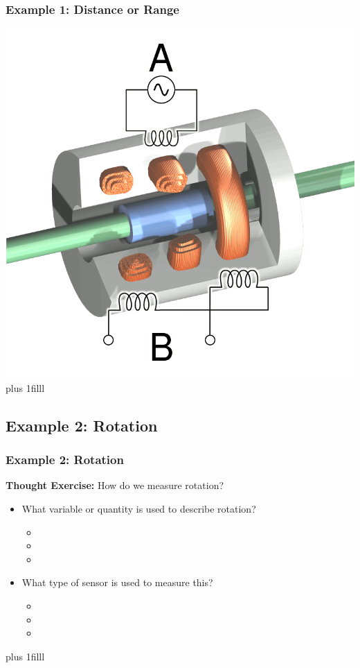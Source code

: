 \documentclass[fleqn]{beamer} %
\newcommand{\sectionIsubsectionIIItitle}{Example 1: Distance or Range}
\newcommand{\sectionIsubsectionIVtitle}{Example 2: Rotation}
\newcommand{\btVFill}{\vskip0pt plus 1filll}
\begin{document}
			\begin{frame}
				\frametitle{\sectionIsubsectionIIItitle}
				\includegraphics[scale=.2]{images/LVDT.png}
				\btVFill

			\end{frame}

		\subsection{\sectionIsubsectionIVtitle}\label{sectionIsubsectionIV}	

			\begin{frame}
				\frametitle{\sectionIsubsectionIVtitle}

					{\bf Thought Exercise:} How do we measure {\BL rotation}?        
	
					\begin{itemize}
					
						\item What variable or quantity is used to describe {\BL rotation}?                         
						\begin{itemize}
							\item
							\item
							\item	
						\end{itemize} \vspace{5mm}
						\item What type of sensor is used to measure this?
						\begin{itemize}
							\item
							\item
							\item	
						\end{itemize}	

					\end{itemize}
				
				\btVFill

				
			\end{frame}
\end{document}
